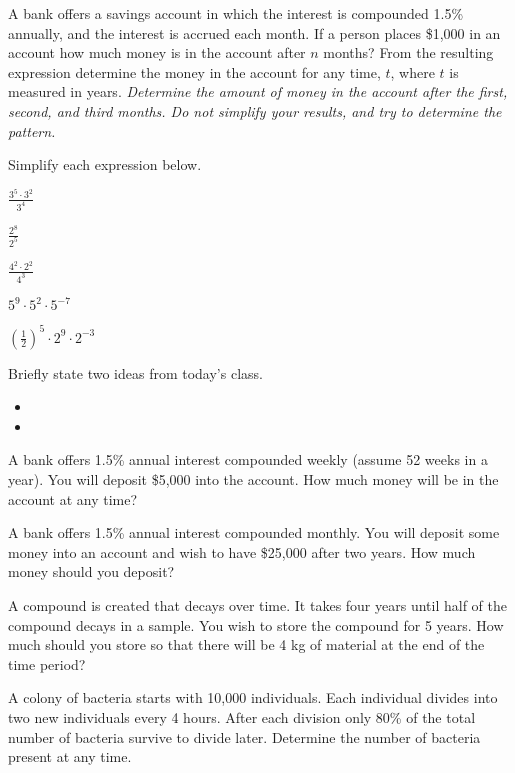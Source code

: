 \begin{problem}
  \clearpage

\item A bank offers a savings account in which the interest is
  compounded 1.5\% annually, and the interest is accrued each
  month. If a person places \$1,000 in an account how much money is in
  the account after $n$ months? From the resulting expression
  determine the money in the account for any time, $t$, where $t$ is
  measured in years.  \textit{Determine the amount of money in the
    account after the first, second, and third months. Do not simplify
    your results, and try to determine the pattern.}

  \vfill

  \clearpage

\item Simplify each expression below.
  \begin{subproblem}
  \item $\frac{3^5\cdot 3^2}{3^4}$
    \vfill
  \item $\frac{2^8}{2^5}$
    \vfill
  \item $\frac{4^2\cdot 2^2}{4^3}$
    \vfill
  \item $5^9\cdot 5^2\cdot 5^{-7}$
    \vfill
  \item $\left(\frac{1}{2}\right)^5 \cdot 2^9 \cdot 2^{-3}$
    \vfill
  \end{subproblem}

\end{problem}

\postClass

\begin{problem}
\item Briefly state two ideas from today's class.
  \begin{itemize}
  \item
  \item
  \end{itemize}
\item A bank offers 1.5\% annual interest compounded weekly (assume 52
  weeks in a year). You will deposit \$5,000 into the account. How
  much money will be in the account at any time?
\item A bank offers 1.5\% annual interest compounded monthly. You will
  deposit some money into an account and wish to have \$25,000 after
  two years. How much money should you deposit?
\item A compound is created that decays over time. It takes four years
  until half of the compound decays in a sample. You wish to store the
  compound for 5 years. How much should you store so that there will be
  4 kg of material at the end of the time period?
\item A colony of bacteria starts with 10,000 individuals. Each
  individual divides into two new individuals every 4 hours. After
  each division only 80\% of the total number of bacteria survive to
  divide later. Determine the number of bacteria present at any time.
\end{problem}


